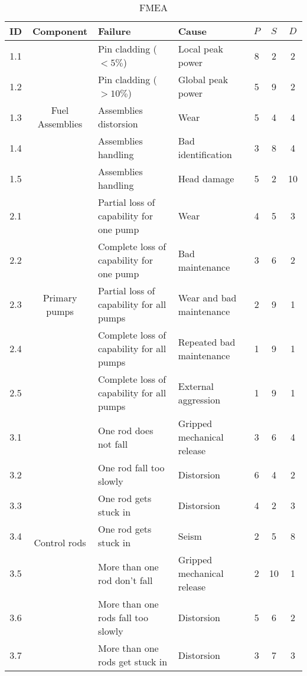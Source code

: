 \begin{table}[!htb]
    \centering
        \begin{tabular}{ccp{5cm}p{5cm}ccc}
        \hline
        ID & Component & Failure & Cause & $P$ & $S$ & $D$ \\ \hline\hline
        1.1 & \multirow{5}{*}{Fuel Assemblies} & Pin cladding ($< 5\%$) & Local peak power & 8 & 2 & 2 \\
        1.2 &                                & Pin cladding ($> 10\%$) & Global peak power & 5 & 9 & 2 \\
        1.3 &                                & Assemblies distorsion & Wear & 5 & 4 & 4 \\
        1.4 &                                & Assemblies handling & Bad identification & 3 & 8 & 4 \\
        1.5 &                                & Assemblies handling & Head damage & 5 & 2 & 10 \\ \hline
        2.1 & \multirow{5}{*}{Primary pumps}  & Partial loss of capability for one pump & Wear & 4 & 5 & 3 \\
        2.2 &                                & Complete loss of capability for one pump & Bad maintenance & 3 & 6 & 2 \\
        2.3 &                                & Partial loss of capability for all pumps & Wear and bad maintenance & 2 & 9 & 1 \\
        2.4 &                                & Complete loss of capability for all pumps & Repeated bad maintenance & 1 & 9 & 1 \\
        2.5 &                                & Complete loss of capability for all pumps & External aggression & 1 & 9 & 1 \\ \hline
        3.1 & \multirow{7}{*}{Control rods} & One rod does not fall & Gripped mechanical release & 3 & 6 & 4 \\
        3.2 &                               & One rod fall too slowly & Distorsion & 6 & 4 & 2 \\
        3.3 &                               & One rod gets stuck in & Distorsion & 4 & 2 & 3 \\
        3.4 &                               & One rod gets stuck in & Seism & 2 & 5 & 8 \\
        3.5 &                               & More than one rod don't fall & Gripped mechanical release & 2 & 10 & 1 \\
        3.6 &                               & More than one rods fall too slowly & Distorsion & 5 & 6 & 2 \\
        3.7 &                               & More than one rods get stuck in & Distorsion & 3 & 7 & 3 \\ \hline
        \end{tabular}
        \caption{FMEA}\label{tab:fmea_risk}
\end{table}



